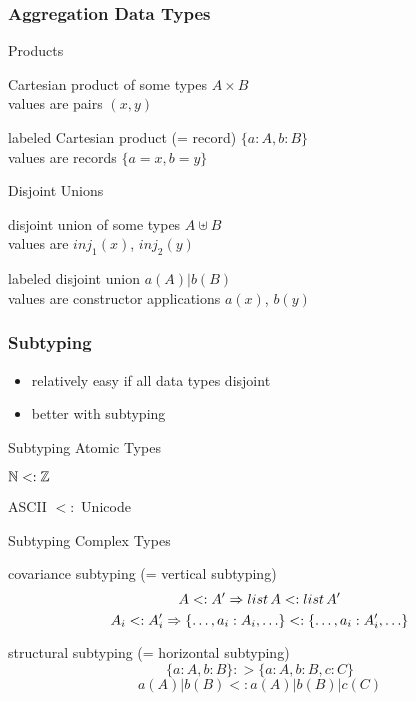 \begin{frame}\frametitle{Aggregation Data Types}
\begin{blockitems}{Products}
 \item Cartesian product of some types $A\times B$ \\
 values are pairs $(x,y)$ 
 \item labeled Cartesian product (= record) $\{a: A, b: B\}$ \\
 values are records $\{a=x, b=y\}$
\end{blockitems}

\begin{blockitems}{Disjoint Unions}
 \item disjoint union of some types $A\uplus B$\\
  values are $inj_1(x)$, $inj_2(y)$
 \item labeled disjoint union $a(A)|b(B)$ \\
  values are constructor applications $a(x)$, $b(y)$
\end{blockitems}

\end{frame}

\begin{frame}\frametitle{Subtyping}
\begin{itemize}
 \item relatively easy if all data types disjoint
 \item better with subtyping
\end{itemize}

\begin{blockitems}{Subtyping Atomic Types}
 \item $\mathbb{N} <: \mathbb{Z}$
 \item ASCII $<:$ Unicode
\end{blockitems}

\begin{blockitems}{Subtyping Complex Types}
 \item covariance subtyping (= vertical subtyping)
  \[A <: A' \Rightarrow list\,A <: list\, A'\]
  \[A_i <: A_i' \Rightarrow \{\ldots, a_i:A_i,\ldots\} <: \{\ldots, a_i:A'_i,\ldots\}\]
 \item structural subtyping (= horizontal subtyping)
  \[\{a:A,b:B\} :> \{a:A,b:B,c:C\}\]
  \[a(A)|b(B) <: a(A)|b(B)|c(C)\]
\end{blockitems}
\end{frame}

